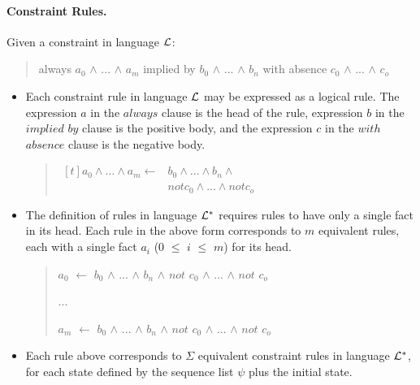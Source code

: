 \documentclass[10pt, twocolumn]{article}
\begin{document}
        \paragraph{Constraint Rules.}

          Given a constraint in language ${\cal L}$:

          \begin{quote}
            always $a_{0}$ $\land$ ... $\land$ $a_{m}$
            implied by $b_{0}$ $\land$ ... $\land$ $b_{n}$
            with absence $c_{0}$ $\land$ ... $\land$ $c_{o}$
          \end{quote}
         
          \begin{itemize}
            \item
              Each constraint rule in language ${\cal L}$ may be expressed
              as a logical rule. The expression $a$ in the $always$ clause
              is the head of the rule, expression $b$ in the $implied$ $by$
              clause is the positive body, and the expression $c$ in the
              $with$ $absence$ clause is the negative body.

              \begin{quote}
                \begin{math}
                  \begin{aligned}[t]
                    a_{0} \land ... \land a_{m} \leftarrow &
                    b_{0} \land ... \land b_{n} \land \\
                    & not c_{0} \land ... \land not c_{o}
                  \end{aligned}
                \end{math}
              \end{quote}
            \item
              The definition of rules in language ${\cal L}^{*}$ requires
              rules to have only a single fact in its head. Each rule in the
              above form corresponds to $m$ equivalent rules, each with a
              single fact $a_{i}$ ($0$ $\leq$ $i$ $\leq$ $m$) for its head.

              \begin{quote}
                $a_{0}$ $\leftarrow$
                $b_{0}$ $\land$ ... $\land$ $b_{n}$ $\land$
                $not$ $c_{0}$ $\land$ ... $\land$ $not$ $c_{o}$

                ...

                $a_{m}$ $\leftarrow$
                $b_{0}$ $\land$ ... $\land$ $b_{n}$ $\land$
                $not$ $c_{0}$ $\land$ ... $\land$ $not$ $c_{o}$
              \end{quote}
            \item
              Each rule above corresponds to $\Sigma$ equivalent constraint
              rules in language ${\cal L}^{*}$, for each state defined by the
              sequence list $\psi$ plus the initial state.
          \end{itemize}
\end{document}
